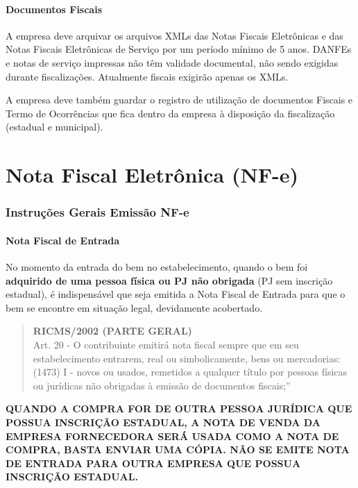 \documentclass{article}
\newcommand{\parte}[1]{
  \pagebreak
  \vfill
  \partfont{\centering}
  \vspace*{\fill}
    \part{#1}    
  \vspace*{\fill}
  \vfill
  \pagebreak
}
\begin{document}
\begin{center}
\begin{longtable}{|P{0.2\linewidth}|P{0.5\linewidth}|P{0.2\linewidth}|}
  \end{longtable}
\end{center}

\subsection{Documentos Fiscais}
\label{arquivo:fiscal}
A empresa deve arquivar os arquivos XMLs das Notas Fiscais Eletrônicas e das Notas Fiscais Eletrônicas de Serviço por um período mínimo de 5 anos. DANFEs e notas de serviço impressas não têm validade documental, não sendo exigidas durante fiscalizações. Atualmente fiscais exigirão apenas os XMLs.

A empresa deve também guardar o registro de utilização de documentos Fiscais e Termo de Ocorrências que fica dentro da empresa à disposição da fiscalização (estadual e municipal).

\parte{Nota Fiscal Eletrônica (NF-e)}
\section{Instruções Gerais Emissão NF-e}
\label{sec:emissao-nfe}
\subsection{Nota Fiscal de Entrada}
\label{emissaonfe:entrada}
No momento da entrada do bem no estabelecimento, quando o bem foi \textbf{adquirido de uma pessoa física ou PJ não obrigada} (PJ sem inscrição estadual), é indispensável que seja emitida a Nota Fiscal de Entrada para que o bem se encontre em situação legal, devidamente acobertado.
\begin{quotation}
  \textbf{RICMS/2002 (PARTE GERAL)} \\
  Art. 20 - O contribuinte emitirá nota fiscal sempre que em seu estabelecimento entrarem, real ou simbolicamente, bens ou mercadorias: \\
  (1473)     I - novos ou usados, remetidos a qualquer título por pessoas físicas ou jurídicas não obrigadas à emissão de documentos fiscais;” \\
\end{quotation}
\begin{tcolorbox}[title=Atenção!]
  \textbf{QUANDO A COMPRA FOR DE OUTRA PESSOA JURÍDICA QUE POSSUA INSCRIÇÃO ESTADUAL, A NOTA DE VENDA DA EMPRESA FORNECEDORA SERÁ USADA COMO A NOTA DE COMPRA, BASTA ENVIAR UMA CÓPIA. NÃO SE EMITE NOTA DE ENTRADA PARA OUTRA EMPRESA QUE POSSUA INSCRIÇÃO ESTADUAL.}
\end{tcolorbox}
\end{document}
